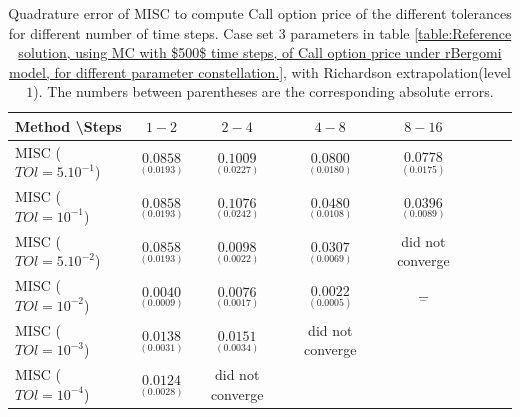 \documentclass[11pt]{article}
\begin{document}
\begin{table}[h!]
	\centering
	\begin{tabular}{l*{6}{c}r}
		Method \textbackslash  Steps            & $1-2$ & $2-4$ & $4-8$ & $8-16$  \\
		\hline
		MISC ($TOl=5.10^{-1}$)  & $\underset{(  0.0193)}{\mathbf{ 0.0858}}$ & $\underset{(0.0227)}{\mathbf{   0.1009}}$ & $\underset{(0.0180)}{\mathbf{  0.0800}}$ & $\underset{(  0.0175
			)}{\mathbf{ 0.0778
		}}$ \\
		MISC ($TOl=10^{-1}$)  & $\underset{(  0.0193)}{\mathbf{ 0.0858}}$& $\underset{(0.0242
			)}{\mathbf{    0.1076}}$ & $\underset{(0.0108)}{\mathbf{
				0.0480}}$ & $\underset{( 0.0089)}{\mathbf{0.0396}}$  \\
		MISC ($TOl=5.10^{-2}$)  & $\underset{(  0.0193)}{\mathbf{ 0.0858}}$ & $\underset{(
			0.0022)}{\mathbf{ 0.0098}}$ & $\underset{( 0.0069)}{\mathbf{
				0.0307}}$ & did not converge \\
		MISC ($TOl=10^{-2}$)  & $\underset{ (0.0009)}{\mathbf{0.0040}}$ & $\underset{(0.0017)}{\mathbf{0.0076}}$ & $\underset{(0.0005)}{\mathbf{0.0022}}$ & $\underset{-}{\mathbf{-}}$  \\
		MISC ($TOl=10^{-3}$)  & $\underset{ (0.0031)}{\mathbf{0.0138}}$ &      $\underset{ ( 0.0034)}{\mathbf{ 0.0151}}$
		& did not converge&\\
		MISC ($TOl=10^{-4}$)  & $\underset{ (0.0028)}{\mathbf{0.0124}}$ &did not converge&&\\
		\hline
	\end{tabular}
	\caption{Quadrature error of MISC to compute Call option price of the different tolerances for different number of time steps. Case set $3$ parameters in table \ref{table:Reference solution, using MC with $500$ time steps, of Call option price under rBergomi model, for different parameter constellation.}, with Richardson extrapolation(level $1$). The numbers between parentheses are the corresponding absolute errors.}
	\label{Quadrature error of MISC to compute Call option price of the different tolerances for different number of time steps. Case set $3$ parameters, with Richardson extrapolation(level $1$). The numbers between parentheses are the corresponding absolute errors.}
\end{table}
\end{document}
